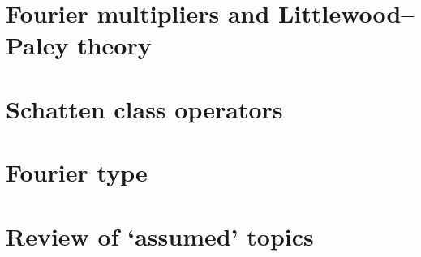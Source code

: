 \documentclass[a4paper,10pt]{amsbook}
\begin{document}
\chapter{Fourier multipliers and Littlewood--Paley theory}
\label{sec:HT}


\chapter{Schatten class operators}
\label{sec:schatten}


\chapter{Fourier type}
\label{sec:fouriertype}



\appendix
\chapter{Review of `assumed' topics}
\label{sec:appendices}






 

\printindex
\end{document}
